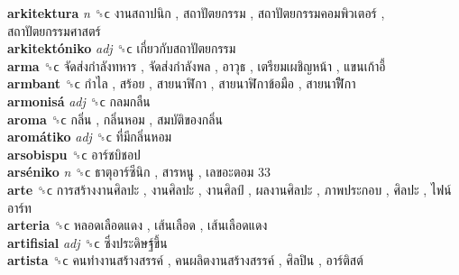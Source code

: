 \textbf{arkitektura} \emph{n}  ␝ϲ   งานสถาปนิก ,  สถาปัตยกรรม ,  สถาปัตยกรรมคอมพิวเตอร์ ,  สถาปัตยกรรมศาสตร์   \\
\textbf{arkitektóniko} \emph{adj}  ␝ϲ   เกี่ยวกับสถาปัตยกรรม   \\
\textbf{arma} ␝ϲ   จัดส่งกำลังทหาร ,  จัดส่งกำลังพล ,  อาวุธ ,  เตรียมเผชิญหน้า ,  แขนเก้าอี้   \\
\textbf{armbant} ␝ϲ   กำไล ,  สร้อย ,  สายนาฬิกา ,  สายนาฬิกาข้อมือ ,  สายนาฬิืกา   \\
\textbf{armonisá} \emph{adj}  ␝ϲ   กลมกลืน   \\
\textbf{aroma} ␝ϲ   กลิ่น ,  กลิ่นหอม ,  สมบัติของกลิ่น   \\
\textbf{aromátiko} \emph{adj}  ␝ϲ   ที่มีกลิ่นหอม   \\
\textbf{arsobispu} ␝ϲ   อาร์ชบิชอป   \\
\textbf{arséniko} \emph{n}  ␝ϲ   ธาตุอาร์ซีนิก ,  สารหนู ,  เลขอะตอม 33   \\
\textbf{arte} ␝ϲ   การสร้างงานศิลปะ ,  งานศิลปะ ,  งานศิลป์ ,  ผลงานศิลปะ ,  ภาพประกอบ ,  ศิลปะ ,  ไฟน์อาร์ท   \\
\textbf{arteria} ␝ϲ   หลอดเลือดแดง ,  เส้นเลือด ,  เส้นเลือดแดง   \\
\textbf{artifisial} \emph{adj}  ␝ϲ   ซึ่งประดิษฐ์ขึ้น   \\
\textbf{artista} ␝ϲ   คนทำงานสร้างสรรค์ ,  คนผลิตงานสร้างสรรค์ ,  ศิลปิน ,  อาร์ติสต์   \\
